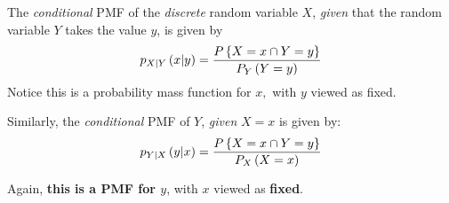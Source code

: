 \documentclass[notes=show,handout]{beamer}\usepackage[]{graphicx}\usepackage[]{color}
\newenvironment{stepitemize}{\begin{itemize}[<+->]}{\end{itemize} }
\renewcommand{\Pr}{P}
\begin{document}
\begin{frame}{\secname}

\begin{definition}
  The \emph{conditional} PMF of the
  \emph{discrete} random variable $X$, \emph{given} that the random variable $
  Y $ takes the value $y$, is given by
  \begin{equation*}
  p_{X|Y}\left( x|y\right) =\frac{\Pr \left\{ X=x\cap Y=y\right\} }{%
  P_{Y}\left( Y=y\right) }
  \end{equation*}
  Notice this is a probability mass function for $x,$ with $y$ viewed as
  fixed.
  \end{definition}

\pause

  Similarly, the \emph{conditional} PMF of $Y$, \emph{given} $X=x$ is given by:
  \begin{equation*}
  p_{Y|X}\left( y|x\right) =\frac{\Pr \left\{ X=x\cap Y=y\right\} }{%
  P_{X}\left( X=x\right) }
  \end{equation*}

  Again, \textbf{this is a PMF for $y$}, with $x$ viewed as \textbf{fixed}.

\end{frame}

%
%
%
%
%
%
%
\end{document}
